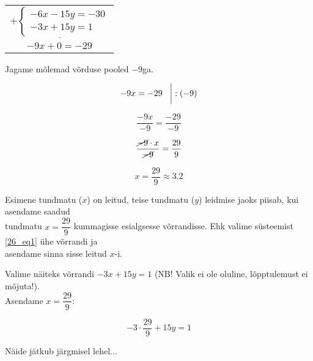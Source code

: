\begin{center}
{{{\begin{flushleft}
\begin{center}
\begin{tabular}{c}
$\underline{+\begin{cases}
-6x-15y=-30 \\
-3x+15y=1
\end{cases}}$\\
$-9x+0=-29$
\end{tabular}
\end{center}

\hspace{5mm}
Jagame mõlemad võrduse pooled $-9$ga.

\[ -9x=-29 \hspace{3mm} \bigg| : (-9) \]

\[ \dfrac{-9x}{-9} = \dfrac{-29}{-9} \]

\[\dfrac{\cancel{-9} \cdot x}{\cancel{-9}} = \dfrac{29}{9}  \]

\[ x=\dfrac{29}{9} \approx 3.2 \]

\hspace{5mm}
Esimene tundmatu ($x$) on leitud, teise tundmatu ($y$) leidmise jaoks piisab, kui asendame saadud\\ \hspace{5mm} tundmatu $x=\dfrac{29}{9}$ kummagisse esialgsesse võrrandisse. Ehk valime süsteemist \ref{26_eq1} ühe võrrandi ja\\ \hspace{5mm} asendame sinna sisse leitud $x$-i.

\vspace{2mm}
\hspace{5mm}
Valime näiteks võrrandi $-3x+15y=1$ (NB! Valik ei ole oluline, lõpptulemust ei mõjuta!).\\ \hspace{5mm} Asendame $x=\dfrac{29}{9}$:

\[ -3 \cdot \dfrac{29}{9}+15y=1 \] 

\hspace{5mm}
Näide jätkub järgmisel lehel...


\end{flushleft}
}}}
\end{center}


